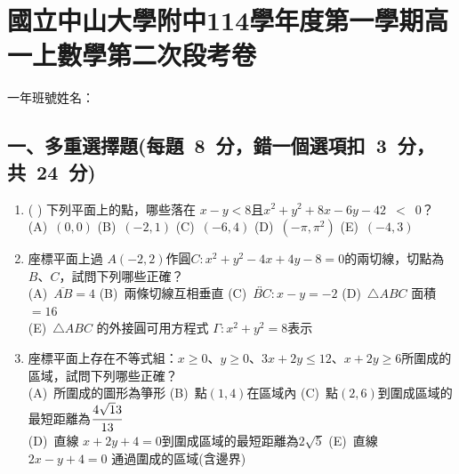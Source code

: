 \documentclass[b4paper,12pt]{exam}
\newcommand\testTitle[1]{\section*{#1}}
\newif\ifshowAnswer
\newcommand{\colorAnswer}[2]{%
{
  \makebox[6em][c]{%
    \ifshowAnswer
      {\color{#1}#2}%
    \else
      \phantom{#2}%
    \fi
  }}%
}
\begin{document}

{\centering
\testTitle{國立中山大學附中114學年度第一學期高一上數學第二次段考卷}
}

\hfill 一年\hspace{2em}班\hspace{2em}號\quad 姓名：\hspace{6em}\quad\\
\vspace{0.5em}


\subsection*{一、多重選擇題(每題\ 8\ 分，錯一個選項扣\ 3\ 分，共\ 24\ 分)}
\begin{enumerate}[itemsep=0.5em, topsep=1em]\setcounter{enumi}{0}
    \item (\colorAnswer{red}{ABCDE}) 下列平面上的點，哪些落在 $x-y<8$且$x^2+y^2+8x-6y-42$~{\color{red}$<$}~$0$？\\[0.5em]
        (A)~{$(0,0)$}\hspace{2em}
        (B)~{$(-2,1)$}\hspace{2em}
        (C)~{$(-6,4)$}\hspace{2em}
        (D)~{$(-\pi,\pi^2)$}\hspace{2em}
        (E)~{$(-4,3)$}\\[0.6em]

    \item 座標平面上過 $A(-2,2)$作圓$C:x^2+y^2-4x+4y-8=0$的兩切線，切點為 $B$、$C$，試問下列哪些正確？\\[0.5em]
        (A)~{$\overline{AB}=4$}\hspace{2em}
        (B)~{兩條切線互相垂直}\hspace{2em}
        (C)~{$\overleftrightarrow{BC}:x-y=-2 $}\hspace{2em}
        (D)~{$\triangle ABC$ 面積$=16$}\\[0.6em]
        (E)~{$\triangle ABC$ 的外接圓可用方程式 $\Gamma:x^2+y^2=8$表示}\\[0.6em]

    \item 座標平面上存在不等式組：$x\geq0$、$y\geq0$、$3x+2y\leq12$、$x+2y\geq6$所圍成的區域，試問下列哪些正確？\\[0.5em]
        (A)~{所圍成的圖形為箏形}\hspace{2em}
        (B)~{點$(1,4)$在區域內}\hspace{2em}
        (C)~{點$(2,6)$到圍成區域的最短距離為$\cfrac{4\sqrt13}{13}$}\\[0.6em]
        (D)~{直線 $x+2y+4=0$到圍成區域的最短距離為$2\sqrt5$}\hspace{2em}
        (E)~{直線 $2x-y+4=0$ 通過圍成的區域(含邊界)}\\  
        
\end{enumerate}
\end{document}
